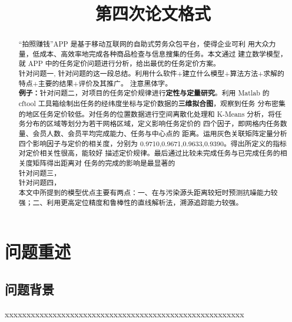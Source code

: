 \documentclass{whutmod}
\title{第四次论文格式}
\begin{document}
	
	\maketitle
	
	\begin{abstract}
“拍照赚钱”APP 是基于移动互联网的自助式劳务众包平台，使得企业可利 用大众力量，低成本、高效率地完成各种商品检查与信息搜集的任务。本文通过 建立数学模型，就 APP 中的任务定价问题进行分析，给出最优的任务定价方案。
   ~\\
   
针对问题一, 针对问题的这一段总结。利用什么软件+建立什么模型+算法方法+求解的特点+主要的结果+评价及其推广。  注意黑体字。
~\\

\textbf{例子：}针对问题二，对项目的任务定价规律进行\textbf{定性与定量研究}。利用 Matlab 的 cftool 工具箱绘制出任务的经纬度坐标与定价数据的\textbf{三维拟合图}，观察到任务 分布密集的地区任务定价较低。对任务的位置数据进行空间离散化处理和 K-Means 分析，将任务分布的区域等划分为若干网格区域，定义影响任务定价的 四个因子，即网格内任务数量、会员人数、会员平均完成能力、任务与中心点的 距离。运用灰色关联矩阵定量分析四个影响因子与定价的相关度，分别为 0.9710,0.9671,0.9633,0.9390。得出所定义的指标对定价相关性很高，能较好 描述定价规律。最后通过比较未完成任务与已完成任务的相关度矩阵得出距离对 任务的完成的影响是最显著的
   ~\\

针对问题三，
   ~\\
   
针对问题四，
   ~\\

本文中所提到的模型优点主要有两点：一、在与污染源头距离较短时预测抗噪能力较强；二、利用更高定位精度和鲁棒性的直线解析法，溯源追踪能力较强。
  
		
	\end{abstract}
	
	\tableofcontents
	\newpage	%
	
	\section{问题重述}
	\subsection{问题背景}
xxxxxxxxxxxxxxxxxxxxxxxxxxxxxxxxxxxxxxxxxxxxxxxxxxxxxxx
	
\end{document}
